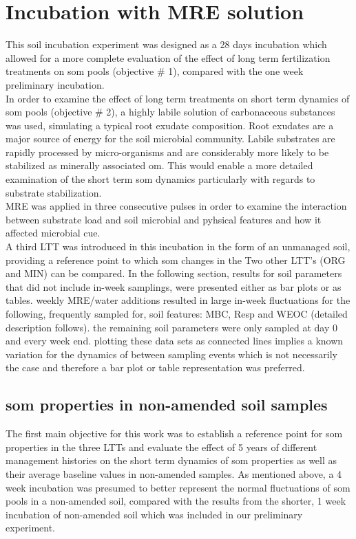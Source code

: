 \section{Incubation with MRE solution}

	This soil incubation experiment was designed as a 28 days incubation which allowed for a more complete evaluation of the effect of long term fertilization treatments on \gls{som} pools (objective \# 1), compared with the one week  preliminary incubation.\\
	In order to examine the effect of long term treatments on short term dynamics of \gls{som} pools (objective \# 2), a highly labile solution of carbonaceous substances was used, simulating a typical root exudate composition. Root exudates are a major source of energy for the soil microbial community. Labile substrates are rapidly processed by micro-organisms and are considerably more likely to be stabilized as minerally associated \gls{om}. This would enable a more detailed examination of the short term \gls{som} dynamics particularly with regards to substrate stabilization. \\
	MRE was applied in three consecutive pulses in order to examine the interaction between substrate load and soil microbial and pyhsical features and how it affected microbial \gls{cue}. \\
	A third LTT was introduced in this incubation in the form of an unmanaged soil, providing a reference point to which \gls{som} changes in the Two other LTT's (ORG and MIN) can be compared.
	In the following section, results for soil parameters that did not include in-week samplings, were presented either as bar plots  or as tables.	weekly MRE/water additions resulted in large in-week fluctuations for the following, frequently sampled for, soil features: MBC, Resp and WEOC (detailed description follows). the remaining soil parameters were only sampled at day 0 and every week end. plotting these data sets as connected lines implies a known variation for the dynamics of between sampling events which is not necessarily the case and therefore a bar plot or table representation was preferred.

	\subsection{\gls{som} properties in non-amended soil samples}

		The first main objective for this work was to establish a reference point  for \gls{som} properties in the three LTTs and evaluate the effect of 5 years of different management histories on the short term dynamics of \gls{som} properties as well as their average baseline values in non-amended samples. As mentioned above, a 4 week incubation was presumed  to better represent the normal fluctuations of \gls{som} pools in a non-amended soil, compared with the results from the shorter, 1 week incubation of non-amended soil which was  included in our preliminary experiment.


